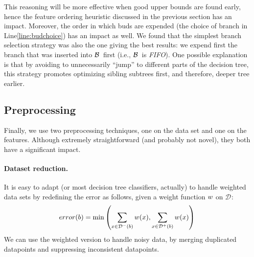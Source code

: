 \documentclass{llncs}
\def\posclass{+}
\def\negclass{-}
\def\datasymb{D}
\newcommand{\setex}[1]{\ensuremath{{\mathcal \datasymb}^{#1}}\xspace}
\newcommand{\posex}{{\setex{\posclass}}\xspace}
\newcommand{\negex}{{\setex{\negclass}}\xspace}
\newcommand{\allex}{{\setex{}}\xspace}
\newcommand{\bud}[0]{\ensuremath{{\cal B}}}
\newcommand{\afeat}[0]{\ensuremath{f}}
\newcommand{\weight}[1][]{\ensuremath{\ifthenelse{\equal{#1}{}}{w}{w({#1})}}}
\newcommand{\error}[1][]{\ensuremath{\ifthenelse{\equal{#1}{}}{{error}}{{error({{#1}})}}}}
\newcommand{\abranch}[0]{\ensuremath{b}}
\newcommand{\numex}[0]{\ensuremath{n}}
\newcommand{\numfeat}[0]{\ensuremath{m}}
\newcommand{\mdepth}[0]{\ensuremath{k}}
\begin{document}
\medskip

This reasoning will be more effective when good upper bounds are found early, hence the feature ordering heuristic discussed in the previous section has an impact. Moreover, the order in which buds are expended (the choice of branch in Line\ref{line:budchoice}) has an impact as well. We found that the simplest branch selection strategy was also the one giving the best results: we expend first the branch that was inserted into \bud\ first (i.e., \bud\ is \emph{FIFO}). One possible explanation is that by avoiding to unnecessarily ``jump'' to different parts of the decision tree, this strategy promotes optimizing sibling subtrees first, and therefore, deeper tree earlier.





















\subsection{Preprocessing}
\label{sec:preprocessing}

Finally, we use two preprocessing techniques, one on the data set and one on the features. Although extremely straightforward (and probably not novel), they both have a significant impact.

\paragraph{Dataset reduction.}
It is easy to adapt \budalg (or most decision tree classifiers, actually) to handle weighted data sets by redefining the error as follows, given a weight function $\weight$ on $\allex$:
$$
\error[\abranch] = \min\left( \sum\limits_{x \in \negex(\abranch)}\weight[x], \sum\limits_{x \in \posex(\abranch)}\weight[x] \right)
$$
We can use the weighted version to handle noisy data, by merging duplicated datapoints and suppressing inconsistent datapoints.
\end{document}
